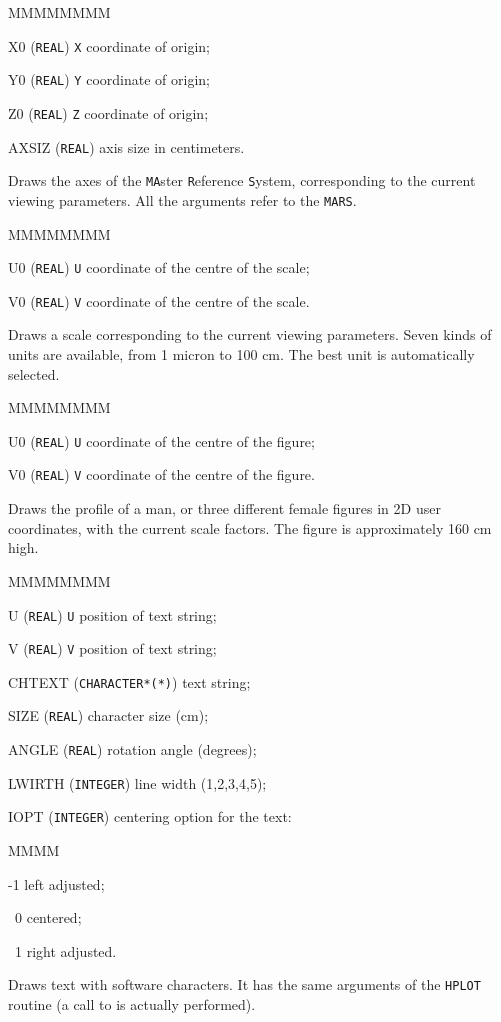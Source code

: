 \begin{DLtt}{MMMMMMMM}
\item[X0]    ({\tt REAL}) {\tt X} coordinate of origin;
\item[Y0]    ({\tt REAL}) {\tt Y} coordinate of origin;
\item[Z0]    ({\tt REAL}) {\tt Z} coordinate of origin;
\item[AXSIZ] ({\tt REAL}) axis size in centimeters.
\end{DLtt}
Draws the axes of the {\tt MA}ster {\tt R}eference {\tt S}ystem,
corresponding to the current viewing parameters.
All the arguments refer to the {\tt MARS}.

\begin{DLtt}{MMMMMMMM}
\item[U0]    ({\tt REAL}) {\tt U} coordinate of the centre of the scale;
\item[V0]    ({\tt REAL}) {\tt V} coordinate of the centre of the scale.
\end{DLtt}
Draws a scale corresponding to the current viewing parameters.
Seven kinds of units are available, from 1 micron to 100 cm.
The best unit is automatically selected.

\begin{DLtt}{MMMMMMMM}
\item[U0]     ({\tt REAL}) {\tt U} coordinate of the centre of the figure;
\item[V0]     ({\tt REAL}) {\tt V} coordinate of the centre of the figure.
\end{DLtt}
Draws the profile of a man, or three different female figures
in 2D user coordinates, with the current scale factors.
The figure is approximately 160 cm high.

\begin{DLtt} {MMMMMMMM}
\item[U]    ({\tt REAL}) {\tt U} position of text string;
\item[V]   ({\tt REAL}) {\tt V}   position of text string;
\item[CHTEXT] ({\tt CHARACTER*(*)}) text string;
\item[SIZE]   ({\tt REAL}) character size (cm);
\item[ANGLE]  ({\tt REAL}) rotation angle (degrees);
\item[LWIRTH] ({\tt INTEGER}) line width (1,2,3,4,5);
\item[IOPT]  ({\tt INTEGER}) centering option for the text:
\begin{DLtt}{MMMM}
\item[-1] left adjusted;
\item[~0] centered;
\item[~1] right adjusted.
\end{DLtt}
\end{DLtt}
Draws text with software characters. It has the same
arguments of the {\tt HPLOT}\cite{bib-HPLOT} routine  
(a call to  is actually performed).

